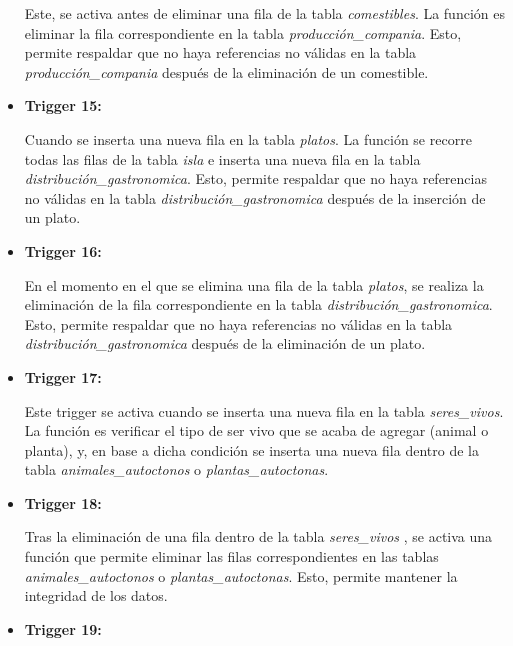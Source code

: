 \documentclass[11pt]{report}
\begin{document}
\begin{itemize}
Este, se activa antes de eliminar una fila de la tabla \emph{comestibles}. La función es eliminar la fila correspondiente en la tabla \emph{producción\_compania}. Esto, permite respaldar que no haya referencias no válidas en la tabla \emph{producción\_compania} después de la eliminación de un comestible.

      \item \textbf{Trigger 15:} 
            \lstset{style=mystyle}
            

Cuando se inserta una nueva fila en la tabla \emph{platos}. La función se recorre todas las filas de la tabla \emph{isla} e inserta una nueva fila en la tabla \emph{distribución\_gastronomica}. Esto, permite respaldar que no haya referencias no válidas en la tabla \emph{distribución\_gastronomica} después de la inserción de un plato.

      \item \textbf{Trigger 16:} 
            \lstset{style=mystyle}
            

En el momento en el que se elimina una fila de la tabla \emph{platos}, se realiza la eliminación de la fila correspondiente en la tabla \emph{distribución\_gastronomica}. Esto, permite respaldar que no haya referencias no válidas en la tabla \emph{distribución\_gastronomica} después de la eliminación de un plato.

      \item \textbf{Trigger 17:} 
            \lstset{style=mystyle}
            

Este trigger se activa cuando se inserta una nueva fila en la tabla \emph{seres\_vivos}. La función es verificar el tipo de ser vivo que se acaba de agregar (animal o planta), y, en base a dicha condición se inserta una nueva fila dentro de la tabla \emph{animales\_autoctonos} o \emph{plantas\_autoctonas}.

      \item \textbf{Trigger 18:} 
            \lstset{style=mystyle}
            

Tras la eliminación de una fila dentro de la tabla \emph{seres\_vivos }, se activa una función que permite eliminar las filas correspondientes en las tablas \emph{animales\_autoctonos} o \emph{plantas\_autoctonas}. Esto, permite mantener la integridad de los datos.

      \item \textbf{Trigger 19:} 
            \lstset{style=mystyle}
            
\end{itemize}
\end{document}
